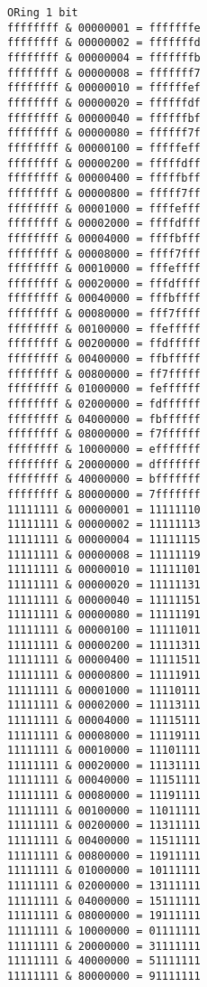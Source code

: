 \documentclass[11pt]{article}
\begin{document}
\begin{verbatim}
ORing 1 bit
ffffffff & 00000001 = fffffffe
ffffffff & 00000002 = fffffffd
ffffffff & 00000004 = fffffffb
ffffffff & 00000008 = fffffff7
ffffffff & 00000010 = ffffffef
ffffffff & 00000020 = ffffffdf
ffffffff & 00000040 = ffffffbf
ffffffff & 00000080 = ffffff7f
ffffffff & 00000100 = fffffeff
ffffffff & 00000200 = fffffdff
ffffffff & 00000400 = fffffbff
ffffffff & 00000800 = fffff7ff
ffffffff & 00001000 = ffffefff
ffffffff & 00002000 = ffffdfff
ffffffff & 00004000 = ffffbfff
ffffffff & 00008000 = ffff7fff
ffffffff & 00010000 = fffeffff
ffffffff & 00020000 = fffdffff
ffffffff & 00040000 = fffbffff
ffffffff & 00080000 = fff7ffff
ffffffff & 00100000 = ffefffff
ffffffff & 00200000 = ffdfffff
ffffffff & 00400000 = ffbfffff
ffffffff & 00800000 = ff7fffff
ffffffff & 01000000 = feffffff
ffffffff & 02000000 = fdffffff
ffffffff & 04000000 = fbffffff
ffffffff & 08000000 = f7ffffff
ffffffff & 10000000 = efffffff
ffffffff & 20000000 = dfffffff
ffffffff & 40000000 = bfffffff
ffffffff & 80000000 = 7fffffff
11111111 & 00000001 = 11111110
11111111 & 00000002 = 11111113
11111111 & 00000004 = 11111115
11111111 & 00000008 = 11111119
11111111 & 00000010 = 11111101
11111111 & 00000020 = 11111131
11111111 & 00000040 = 11111151
11111111 & 00000080 = 11111191
11111111 & 00000100 = 11111011
11111111 & 00000200 = 11111311
11111111 & 00000400 = 11111511
11111111 & 00000800 = 11111911
11111111 & 00001000 = 11110111
11111111 & 00002000 = 11113111
11111111 & 00004000 = 11115111
11111111 & 00008000 = 11119111
11111111 & 00010000 = 11101111
11111111 & 00020000 = 11131111
11111111 & 00040000 = 11151111
11111111 & 00080000 = 11191111
11111111 & 00100000 = 11011111
11111111 & 00200000 = 11311111
11111111 & 00400000 = 11511111
11111111 & 00800000 = 11911111
11111111 & 01000000 = 10111111
11111111 & 02000000 = 13111111
11111111 & 04000000 = 15111111
11111111 & 08000000 = 19111111
11111111 & 10000000 = 01111111
11111111 & 20000000 = 31111111
11111111 & 40000000 = 51111111
11111111 & 80000000 = 91111111
\end{verbatim}
\end{document}
